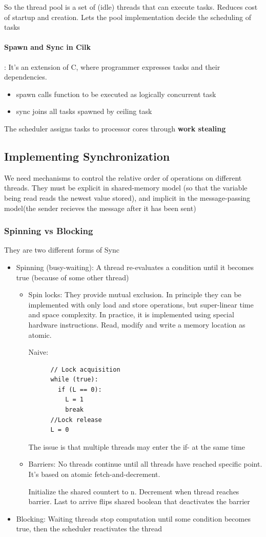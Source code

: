 \documentclass{article}
\begin{document}
So the thread pool is a set of (idle) threads that can execute tasks. Reduces cost of startup and creation. Lets the pool implementation decide the scheduling of tasks

\paragraph{Spawn and Sync in Cilk}: It's an extension of C, where programmer expresses tasks and their dependencies.
\begin{itemize}
  \item spawn calls function to be executed as logically concurrent task
  \item sync joins all tasks spawned by ceiling task
\end{itemize}
The scheduler assigns tasks to processor cores through \textbf{work stealing}

\subsection{Implementing Synchronization}
We need mechanisms to control the relative order of operations on different threads. They must be explicit in shared-memory model (so that the variable being read reads the newest value stored), and implicit in the message-passing model(the sender recieves the message after it has been sent)

\subsubsection{Spinning vs Blocking}
They are two different forms of Sync
\begin{itemize}
  \item Spinning (busy-waiting): A thread re-evaluates a condition until it becomes true (because of some other thread)
  \begin{itemize}
    \item Spin locks: They provide mutual exclusion. In principle they can be implemented with only load and store operations, but super-linear time and space complexity. In practice, it is implemented using special hardware instructions. Read, modify and write a memory location as atomic.
    
    Naive:
    \begin{lstlisting}
      // Lock acquisition
      while (true):
        if (L == 0):
          L = 1
          break
      //Lock release
      L = 0
    \end{lstlisting}
    The issue is that multiple threads may enter the if- at the same time
    \item Barriers: No threads continue until all threads have reached specific point. It's based on atomic fetch-and-decrement.
    
    Initialize the shared countert to n. Decrement when thread reaches barrier. Last to arrive flips shared boolean that deactivates the barrier
  \end{itemize}
  \item Blocking: Waiting threads stop computation until some condition becomes true, then the scheduler reactivates the thread
\end{itemize}
\end{document}
